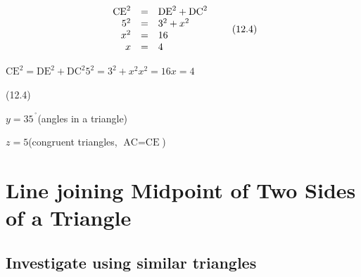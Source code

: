 {\begin{mdframed}[linewidth=4, leftmargin=40, rightmargin=40]
\begin{exercise}
\begin{enumerate}[noitemsep, label=\textbf{Step} \textbf{\arabic*}. ]
{    \begin{equation}
    \begin{array}{ccc}\hfill {\text{CE}}^{2}& =& {\text{DE}}^{2}+{\text{DC}}^{2}\hfill \\ \hfill {5}^{2}& =& {3}^{2}+{x}^{2}\hfill \\ \hfill {x}^{2}& =& 16\hfill \\ \hfill x& =& 4\hfill \end{array}\tag{12.4}
      \end{equation}
    }{%
    \setlength{\mymathboxwidth}{\columnwidth}
      \addtolength{\mymathboxwidth}{-48pt}
    \par\vspace{12pt}\noindent\begin{minipage}{\columnwidth}
    \parbox[t]{\mymathboxwidth}{\large\begin{math}
    {\text{CE}}^{2}={\text{DE}}^{2}+{\text{DC}}^{2}{5}^{2}={3}^{2}+{x}^{2}{x}^{2}=16x=4\end{math}}\hfill
    \parbox[t]{48pt}{\raggedleft 
    (12.4)}
    \end{minipage}\vspace{12pt}\par
    }%
      \par 
      \label{m39368*id1166229837179}\begin{math}y={35}^{\ensuremath{{\,}^{\circ}}}\end{math}\hspace{1ex}(angles in a triangle)\par 
      \label{m39368*id1166228117285}\begin{math}z=5\end{math}\hspace{1ex}(congruent triangles, 
\begin{math}\text{AC}=\text{CE}\end{math})\par \end{enumerate}
    \end{exercise}
    \end{mdframed}
    }
    \noindent
\section{Line joining Midpoint of Two Sides of a Triangle}
  \subsection{Investigate using similar triangles}
